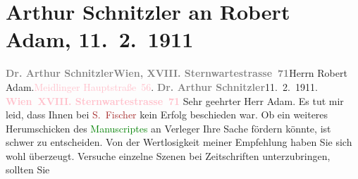 

               \section[Arthur Schnitzler an Robert Adam, 11. 2. 1911]{ Arthur Schnitzler an Robert Adam, 11. 2. 1911}\nopagebreak{}\rehead{ }\normalsize\beginnumbering{} \toendnotes[C]{\smallbreak\pagebreak[2]} 
\toendnotes[C]{\smallbreak}\pstart{}{\pb}\textcolor{gray}{\textbf{Dr. Arthur Schnitzler}}\pend{}\pstart{}\textcolor{pink}{\textcolor{gray}{\textbf{Wien, XVIII. Sternwartestrasse 71}}}{}\ledrightnote{\textcolor{pink}{Sternwartestraße}}\pend{}{\bigskip}\pstart{}{\pb}Herrn Robert Adam\pend{}\pstart{}\textcolor{pink}{}{}\ledrightnote{\textcolor{pink}{XII., Meidling}}.\pend{}\pstart{}\textcolor{pink}{Meidlinger Hauptstraße 56}{}\ledrightnote{\textcolor{pink}{Meidlinger Hauptstraße}}.\pend{}{\bigskip}\pstart
           {\pb}\textcolor{gray}{\textbf{Dr. Arthur Schnitzler}}\hfill 11. 2. 1911.\pend
           \pstart
           \textcolor{gray}{\textbf{\textcolor{pink}{Wien XVIII. Sternwartestrasse 71}{}\ledrightnote{\textcolor{pink}{Sternwartestraße}}}}\pend
           \pstart\center{}Sehr geehrter Herr Adam.\pend\pstart
           Es tut mir leid, dass Ihnen bei \textcolor{brown}{S. Fischer}{}\ledrightnote{\textcolor{brown}{S. Fischer Verlag}} kein
               Erfolg beschieden war. Ob ein weiteres Herumschicken des \textcolor{green}{Manuscriptes}{} an Verleger Ihre Sache fördern könnte, ist
               schwer zu entscheiden. Von der Wertlosigkeit meiner Empfehlung haben Sie sich wohl
               überzeugt. Versuche einzelne Szenen bei Zeitschriften unterzubringen, sollten Sie

